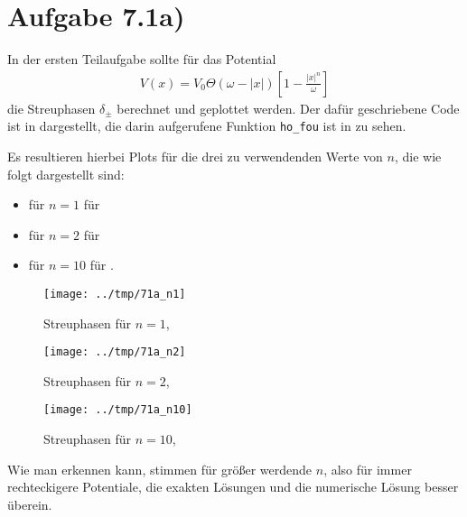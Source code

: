 \section*{Aufgabe 7.1a)}
In der ersten Teilaufgabe sollte für das Potential
\begin{eqnarray}
V(x) = V_0 \Theta(ω-|x|)\left[ 1-\frac{|x|^n}{ω} \right]
\end{eqnarray}
die Streuphasen $δ_{\pm}$ berechnet und geplottet werden. Der dafür geschriebene
Code ist in  dargestellt, die darin aufgerufene Funktion \texttt{ho\_fou}
ist in  zu sehen.




Es resultieren hierbei Plots für die drei zu verwendenden Werte von $n$, die wie
folgt dargestellt sind:
\begin{itemize}
\item für $n=1$ für 
\item für $n=2$ für 
\item für $n=10$ für .
\end{itemize}

\begin{figure}[htb]
  \centering
  \texttt{[image: ../tmp/71a\_n1]}
  \caption{Streuphasen für $n=1$, }
  \label{fig:n1}
\end{figure}

\begin{figure}[htb]
  \centering
  \texttt{[image: ../tmp/71a\_n2]}
  \caption{Streuphasen für $n=2$, }
  \label{fig:n2}
\end{figure}

\begin{figure}[htb]
  \centering
  \texttt{[image: ../tmp/71a\_n10]}
  \caption{Streuphasen für $n=10$, }
  \label{fig:n10}
\end{figure}

Wie man erkennen kann, stimmen für größer werdende $n$, also für immer rechteckigere
Potentiale, die exakten Lösungen und die numerische Lösung besser überein.

